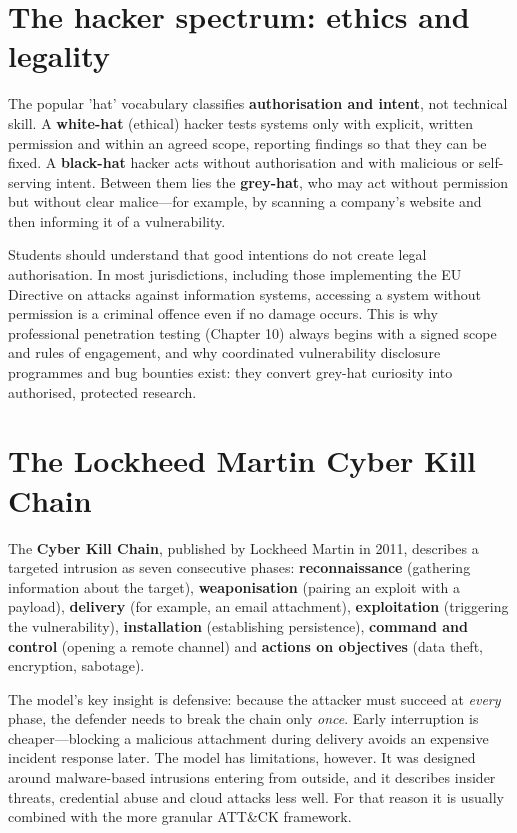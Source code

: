 \section{The hacker spectrum: ethics and legality}\label{sec:3.2}
The popular 'hat' vocabulary classifies \textbf{authorisation and intent}, not technical skill. A \textbf{white-hat} (ethical) hacker tests systems only with explicit, written permission and within an agreed scope, reporting findings so that they can be fixed. A \textbf{black-hat} hacker acts without authorisation and with malicious or self-serving intent. Between them lies the \textbf{grey-hat}, who may act without permission but without clear malice—for example, by scanning a company's website and then informing it of a vulnerability.

Students should understand that good intentions do not create legal authorisation. In most jurisdictions, including those implementing the EU Directive on attacks against information systems, accessing a system without permission is a criminal offence even if no damage occurs. This is why professional penetration testing (Chapter 10) always begins with a signed scope and rules of engagement, and why coordinated vulnerability disclosure programmes and bug bounties exist: they convert grey-hat curiosity into authorised, protected research.

\section{The Lockheed Martin Cyber Kill Chain}\label{sec:3.3}
The \textbf{Cyber Kill Chain}, published by Lockheed Martin in 2011, describes a targeted intrusion as seven consecutive phases: \textbf{reconnaissance} (gathering information about the target), \textbf{weaponisation} (pairing an exploit with a payload), \textbf{delivery} (for example, an email attachment), \textbf{exploitation} (triggering the vulnerability), \textbf{installation} (establishing persistence), \textbf{command and control} (opening a remote channel) and \textbf{actions on objectives} (data theft, encryption, sabotage).

The model's key insight is defensive: because the attacker must succeed at \emph{every} phase, the defender needs to break the chain only \emph{once}. Early interruption is cheaper—blocking a malicious attachment during delivery avoids an expensive incident response later. The model has limitations, however. It was designed around malware-based intrusions entering from outside, and it describes insider threats, credential abuse and cloud attacks less well. For that reason it is usually combined with the more granular ATT\&CK framework.

